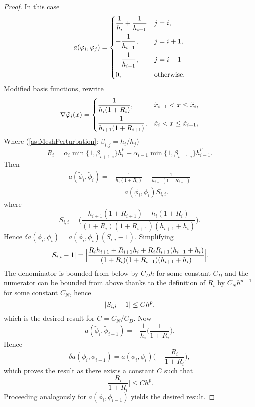 \documentclass[10pt]{article}
\begin{document}
\begin{proof}
	In this case
	\begin{equation}
		a(\phi_i, \phi_j) = \begin{dcases} \frac{1}{h_i} + \frac{1}{h_{i+1}} &j = i, \\
		-\frac{1}{h_{i+1}}, &j = i+1, \\
		-\frac{1}{h_{i-1}}, &j = i-1 \\				
		0, &\text{otherwise}.
	\end{dcases} 
	\end{equation}
	Modified basis functions, rewrite 
	\begin{equation}
	\nabla \tilde \phi_i(x) = \begin{dcases}
		\frac{1}{h_i (1+R_i)}, &\tilde x_{i-1} < x \leq \tilde x_i,\\
		\frac{1}{h_{i+1} (1+R_{i+1})}, &\tilde x_i < x \leq \tilde x_{i+1},
	\end{dcases}
	\end{equation}
	Where (\cref{as:MeshPerturbation}: $\beta_{i, j} = h_i / h_j$)
	\begin{equation}
		R_i = \alpha_i \min\{1, \beta_{i+1, i}\}\bar h_i^p - \alpha_{i-1} \min\{1, \beta_{i-1, i}\} \bar h_{i-1}^p.
	\end{equation}
	Then
	\begin{equation}
	\begin{aligned}
		a(\tilde \phi_i, \tilde \phi_i) =& \frac{1}{h_i (1+R_i)} + \frac{1}{h_{i+1}(1+R_{i+1})} \\
		&= a(\phi_i, \phi_i) S_{i,i}.
	\end{aligned}
	\end{equation}
	where
	\begin{equation}
		S_{i,i} = \Big(\frac{h_{i+1}(1+R_{i+1}) + h_i(1+R_i)}{(1+R_i)(1+R_{i+1})(h_{i+1} + h_i)}\Big).
	\end{equation}
	Hence $\delta a(\phi_i, \phi_i) = a(\phi_i, \phi_i)(S_{i,i} - 1)$. Simplifying
	\begin{equation}
		\abs{S_{i,i} - 1}= \Big|\frac{R_i h_{i+1} + R_{i+1}h_i + R_i R_{i+1}(h_{i+1} + h_i)}{(1+R_i)(1+R_{i+1})(h_{i+1} + h_i)}\Big|.
	\end{equation}
	The denominator is bounded from below by $C_D h$ for some constant $C_D$ and the numerator can be bounded from above thanks to the definition of $R_i$ by $C_N h^{p+1}$ for some constant $C_N$, hence
	\begin{equation}
		\abs{S_{i,i} - 1} \leq C h^p,
	\end{equation}
	which is the desired result for $C = C_N / C_D$. Now
	\begin{equation}
		a(\tilde \phi_i, \tilde \phi_{i-1}) = -\frac{1}{h_i}\Big(\frac{1}{1+R_i}\Big).
	\end{equation}
	Hence
	\begin{equation}
		\delta a(\phi_i, \phi_{i-1}) = a(\phi_i, \phi_i) \Big(-\frac{R_i}{1+R_i}\Big),
	\end{equation}
	which proves the result as there exists a constant $C$ such that
	\begin{equation}
		\Big|\frac{R_i}{1+R_i}\Big| \leq C h^p.
	\end{equation}
	Proceeding analogously for $a(\phi_i, \phi_{i-1})$ yields the desired result.
		

\end{proof}
\end{document}
